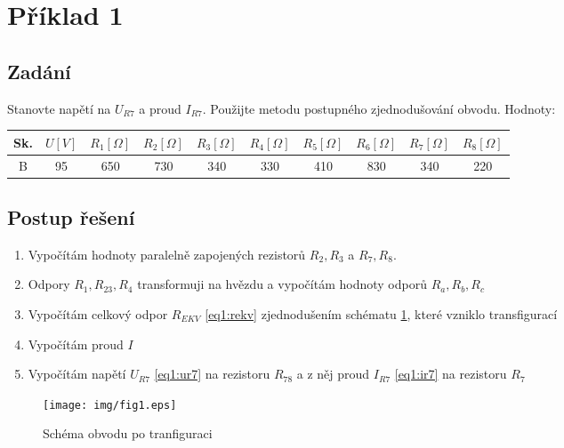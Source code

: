 \documentclass[12pt,a4paper,titlepage,final]{article}
\begin{document}
\newpage
\pagestyle{empty}

\def\author{Lukáš Vokráčko}
\def\email{xvokra00@stud.fit.vutbr.cz}
\def\projname{Semestrální projekt - řešení obvodů}



\tableofcontents

\newpage
\pagestyle{plain}
\setcounter{page}{1}

\section{Příklad 1}
\subsection{Zadání}
Stanovte napětí na $U_{R7}$ a proud $I_{R7}$. Použijte metodu postupného zjednodušování obvodu.
Hodnoty:\\
\begin{tabular}{|c|c|c|c|c|c|c|c|c|c|}
\hline
Sk. & $U [V]$ & $R_1 [\Omega]$ & $R_2 [\Omega]$ & $R_3 [\Omega]$ & $R_4 [\Omega]$ & $R_5 [\Omega]$  & $R_6 [\Omega]$ & $R_7 [\Omega]$ & $R_8 [\Omega]$\\
\hline
B & 95 & 650 & 730 & 340 & 330 & 410 & 830 & 340 & 220\\
\hline
\end{tabular}

\subsection{Postup řešení}
\begin{enumerate}
\item Vypočítám hodnoty paralelně zapojených rezistorů $R_2, R_3$ a $R_7, R_8$.
\item Odpory $R_1, R_{23}, R_4$ transformuji na hvězdu a vypočítám hodnoty odporů $R_a, R_b, R_c$
\item Vypočítám celkový odpor $R_{EKV}$ \ref{eq1:rekv} zjednodušením schématu \ref{fig1}, které vzniklo transfigurací
\item Vypočítám proud $I$
\item Vypočítám napětí $U_{R7}$ \ref{eq1:ur7} na rezistoru $R_{78}$ a z něj proud $I_{R7}$ \ref{eq1:ir7} na rezistoru $R_7$
\end{enumerate}
\begin{figure}[h]
  \centering
  \texttt{[image: img/fig1.eps]}
  \caption{Schéma obvodu po tranfiguraci}
  \label{fig1}
\end{figure}
\end{document}
